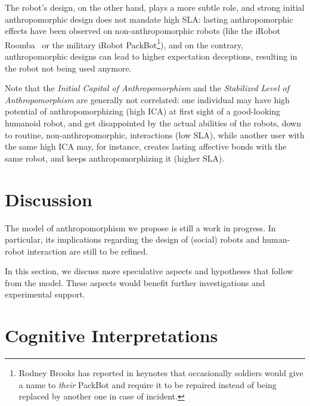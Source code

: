 \documentclass{frontiersSCNS} %
\begin{document}
The robot's design, on the other hand, plays a more subtle role, and strong
initial anthropomorphic design does not mandate high SLA: lasting
anthropomorphic effects have been observed on non-anthropomorphic robots (like
the iRobot Roomba~\cite{fink_living_2013} or the military iRobot
PackBot\footnote{Rodney Brooks has reported in keynotes that occasionally
soldiers would give a name to \emph{their} PackBot and require it to be repaired
instead of being replaced by another one in case of incident.}), and on the
contrary, anthropomorphic designs can lead to higher expectation deceptions,
resulting in the robot not being used anymore.

Note that the \emph{Initial Capital of Anthropomorphism} and the
\emph{Stabilized Level of Anthropomorphism} are generally not correlated: one
individual may have high potential of anthropomorphizing (high ICA) at first
sight of a good-looking humanoid robot, and get disappointed by the actual
abilities of the robots, down to routine, non-anthropomorphic, interactions (low
SLA), while another user with the same high ICA may, for instance, creates
lasting affective bonds with the same robot, and keeps anthropomorphizing it
(higher SLA).

%
%
%
%
%
%

\section{Discussion}
\label{sec:discussion}

The model of anthropomorphism we propose is still a work in progress. In
particular, its implications regarding the design of (social) robots and
human-robot interaction are still to be refined.

In this section, we discuss more speculative aspects and hypotheses that follow
from the model. These aspects would benefit further investigations and
experimental support.

\section{Cognitive Interpretations}
\label{sec:cognitivemodel}
\end{document}
